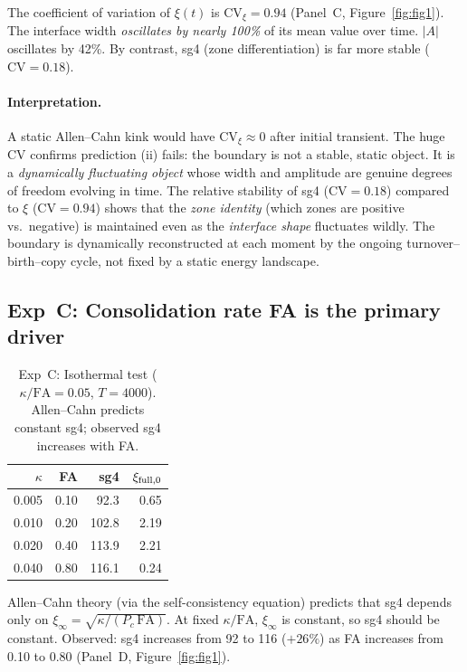 \documentclass[11pt,a4paper]{article}
\begin{document}
The coefficient of variation of $\xi(t)$ is $\mathrm{CV}_\xi = 0.94$
(Panel~C, Figure~\ref{fig:fig1}).  The interface width \emph{oscillates by
nearly 100\%} of its mean value over time.
$|A|$ oscillates by 42\%.  By contrast, sg4 (zone differentiation) is far
more stable ($\mathrm{CV}=0.18$).

\paragraph{Interpretation.}
A static Allen--Cahn kink would have $\mathrm{CV}_\xi\approx0$ after initial
transient.  The huge CV confirms prediction (ii) fails: the boundary is not
a stable, static object.  It is a \emph{dynamically fluctuating object}
whose width and amplitude are genuine degrees of freedom evolving in time.
The relative stability of sg4 ($\mathrm{CV}=0.18$) compared to $\xi$
($\mathrm{CV}=0.94$) shows that the \emph{zone identity} (which zones are positive
vs.\ negative) is maintained even as the \emph{interface shape} fluctuates
wildly.  The boundary is dynamically reconstructed at each moment by the
ongoing turnover--birth--copy cycle, not fixed by a static energy landscape.

\subsection{Exp~C: Consolidation rate FA is the primary driver}

\begin{table}[h]
\centering
\small
\caption{Exp~C: Isothermal test ($\kappa/\mathrm{FA}=0.05$, $T=4000$).
         Allen--Cahn predicts constant sg4; observed sg4 increases with FA.}
\label{tab:expc}
\begin{tabular}{rrrr}
\toprule
$\kappa$ & FA & sg4 & $\xi_{\rm full,0}$ \\
\midrule
0.005 & 0.10 &  92.3 & 0.65 \\
0.010 & 0.20 & 102.8 & 2.19 \\
0.020 & 0.40 & 113.9 & 2.21 \\
0.040 & 0.80 & 116.1 & 0.24 \\
\bottomrule
\end{tabular}
\end{table}

Allen--Cahn theory (via the self-consistency equation) predicts that sg4
depends only on $\xi_\infty = \sqrt{\kappa/(P_c\,\mathrm{FA})}$.  At fixed
$\kappa/\mathrm{FA}$, $\xi_\infty$ is constant, so sg4 should be
constant.  Observed: sg4 increases from 92 to 116 ($+26\%$) as FA increases
from 0.10 to 0.80 (Panel~D, Figure~\ref{fig:fig1}).
\end{document}
